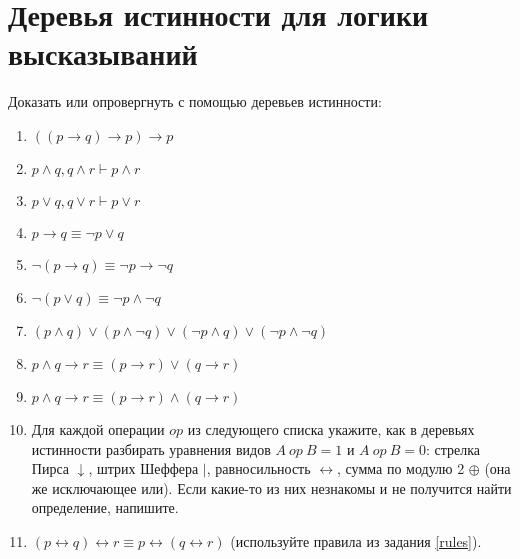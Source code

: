 \documentclass{article}
\begin{document}
\section{Деревья истинности для логики высказываний}
Доказать или опровергнуть с помощью деревьев истинности:
\begin{enumerate}
    \item $((p \to q) \to p) \to p$
    \item $p \land q, q \land r \vdash p \land r$
    \item $p \lor q, q \lor r \vdash p \lor r$
    \item $p \to q \equiv \neg p \lor q$
    \item $\neg (p \to q) \equiv \neg p \to \neg q$
    \item $\neg (p \lor q) \equiv \neg p \land \neg q$
    \item $(p \land q) \lor (p \land \neg q) \lor (\neg p \land q) \lor (\neg p \land \neg q)$
    \item $p \land q \to r \equiv (p \to r) \lor (q \to r)$
    \item $p \land q \to r \equiv (p \to r) \land (q \to r)$
    \item \label{rules} Для каждой операции $op$ из следующего списка укажите, как в деревьях истинности разбирать уравнения видов $A~op~B = 1$ и $A~op~B = 0$: стрелка Пирса $\downarrow$, штрих Шеффера $\mid$, равносильность $\leftrightarrow$, сумма по модулю 2 $\oplus$ (она же исключающее или). Если какие-то из них незнакомы и не получится найти определение, напишите.
    \item $(p \leftrightarrow q) \leftrightarrow r \equiv p \leftrightarrow (q \leftrightarrow r)$ (используйте правила из задания \ref*{rules}).
\end{enumerate}
\end{document}
